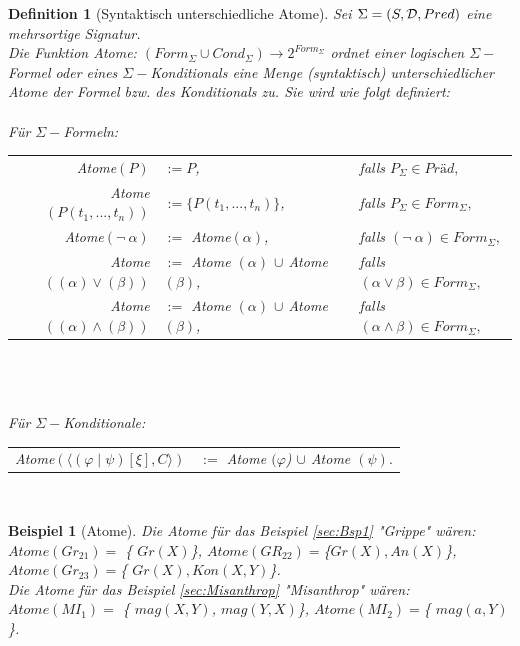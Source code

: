 \documentclass[a4paper, 11pt]{book}
\newtheorem{Def}{Definition }[section]
\newtheorem{Bsp}{Beispiel}[section]
\begin{document}
\begin{Def}[Syntaktisch unterschiedliche Atome]\cite[Kap. 6.2., S. 131/132, Def. 6.2.12]{Fis10}
Sei $ \Sigma = (S,\\ {\cal D}, Pred) $ eine mehrsortige Signatur.\\
Die Funktion Atome: $ (Form_{\Sigma} \cup Cond_{\Sigma}) \rightarrow 2^{Form_{\Sigma}}$ ordnet einer logischen $ \Sigma- $Formel oder eines $ \Sigma- $Konditionals eine Menge (syntaktisch) unterschiedlicher Atome der Formel bzw. des Konditionals zu.
Sie wird wie folgt definiert:\\
\\Für $ \Sigma- $Formeln: 

\begin{tabular}{rll}
Atome$ (P) $ & $ := {P} $, & falls $ P_{\Sigma} \in Präd,$ \\
Atome$ (P(t_1, ..., t_n)) $ & $ := \{P(t_1, ..., t_n)\} $, & falls $ P_{\Sigma} \in Form_{\Sigma},$ \\
Atome$ (\neg ~ \alpha) $ & $ := $ Atome$ (\alpha) $, & falls $ (\neg ~ \alpha) \in Form_{\Sigma},$ \\
Atome$ ((\alpha) \vee (\beta)) $ & $ := $ Atome $ (\alpha) $  $ \cup$ Atome $ (\beta) $, & falls $ (\alpha \vee \beta) \in Form_{\Sigma},$ \\
Atome$ ((\alpha) \wedge (\beta)) $ & $ := $ Atome $ (\alpha) $  $ \cup$ Atome $ (\beta) $, & falls $ (\alpha \wedge \beta) \in Form_{\Sigma},$ \\
\end{tabular}\\ 
\\
\\
Für $ \Sigma- $Konditionale:

\begin{tabular}{rl}
Atome$(  \langle (\varphi \mid \psi)[\xi], C \rangle) $ & $ :=   $ Atome $ (\varphi$) $ \cup $  Atome $ (\psi ).$ \\
\end{tabular}
\\
\end{Def}


\begin{Bsp}[Atome]
Die Atome für das Beispiel \ref{sec:Bsp1} "{}Grippe"{}  wären:\\
$ Atome(Gr_{21}) = $  \{ $Gr(X) $\}, $ Atome(GR_{22}) = $\{$Gr(X), An(X)$\},  $Atome(Gr_{23}) = $\{ $Gr(X), Kon(X, Y) $\}. \\

Die Atome für das Beispiel \ref{sec:Misanthrop} "{}Misanthrop"{} wären:\\
$ Atome(MI_{1}) = $  \{ $mag(X, Y) $, $mag(Y, X) $\}, $Atome(MI_{2}) = $\{ $mag(a, Y)  $\}. \\
\\
\end{Bsp}
\end{document}
